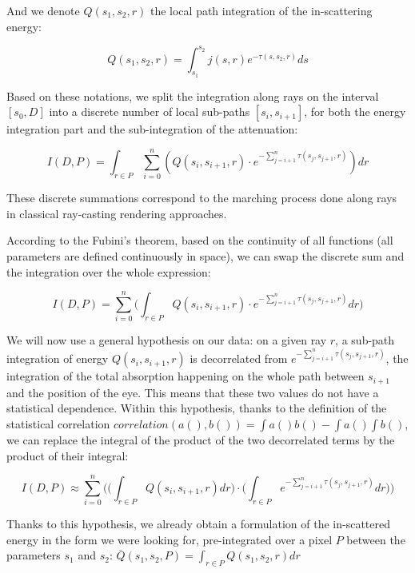 And we denote $Q(s_1,s_2,r)$ the local path integration of the in-scattering energy:

\begin{equation*}
	Q(s_1,s_2,r)=\int^{s_2}_{s_1}j(s,r)e^{-\tau(s,s_2,r)}ds
\end{equation*}

Based on these notations, we split the integration along rays on the interval $[s_0,D]$ into a discrete number of local sub-paths $[s_i,s_{i+1}]$, for both the energy integration part and the sub-integration of the attenuation:

\begin{equation*}
	I(D,P)=\int_{r\in P}\sum^{n}_{i=0}(Q(s_i,s_{i+1},r)\cdot e^{-\sum^{n}_{j=i+1}\tau(s_j,s_{j+1},r)})dr
\end{equation*}

These discrete summations correspond to the marching process done along rays in classical ray-casting rendering approaches.

According to the Fubini's theorem, based on the continuity of all functions (all parameters are defined continuously in space), we can swap the discrete sum and the integration over the whole expression:

\begin{equation*}
	I(D,P)=\sum^{n}_{i=0}\Bigg( \int_{r\in P}Q(s_i,s_{i+1},r)\cdot e^{-\sum^{n}_{j=i+1}\tau(s_j,s_{j+1},r)}dr\Bigg)
\end{equation*}

We will now use a general hypothesis on our data: on a given ray $r$, a sub-path integration of energy $Q(s_i,s_{i+1},r)$ is decorrelated from $e^{-\sum^{n}_{j=i+1}\tau(s_j,s_{j+1},r)}$, the integration of the total absorption happening on the whole path between $s_{i+1}$ and the position of the eye. This means that these two values do not have a statistical dependence. Within this hypothesis, thanks to the definition of the statistical correlation $correlation(a(),b())=\int a()b()-\int a()\int b()$, we can replace the integral of the product of the two decorrelated terms by the product of their integral:

\begin{equation*}
	I(D,P)\approx \sum^{n}_{i=0}\Bigg(\Bigg( \int_{r\in P}Q(s_i,s_{i+1},r)dr\Bigg)\cdot\Bigg( \int_{r\in P} e^{-\sum^{n}_{j=i+1}\tau(s_j,s_{j+1},r)}dr\Bigg)\Bigg)
\end{equation*}

Thanks to this hypothesis, we already obtain a formulation of the in-scattered energy in the form we were looking for, pre-integrated over a pixel $P$ between the parameters $s_1$ and $s_2$: $\overline{Q}(s_1,s_2,P)=\int_{r\in P}Q(s_1,s_2,r)dr$


